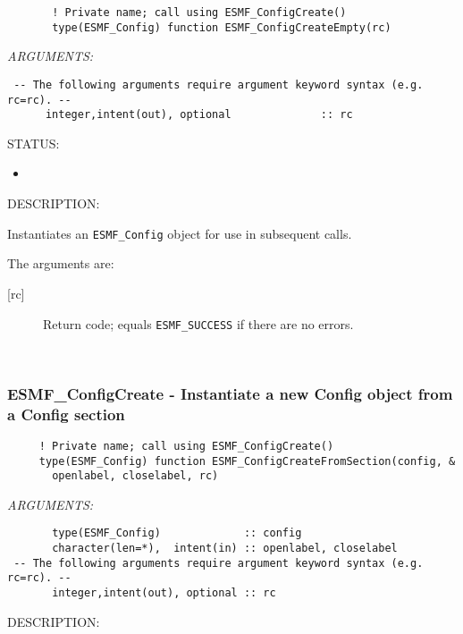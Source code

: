   
\begin{verbatim}       ! Private name; call using ESMF_ConfigCreate()
       type(ESMF_Config) function ESMF_ConfigCreateEmpty(rc)
 \end{verbatim}{\em ARGUMENTS:}
\begin{verbatim} -- The following arguments require argument keyword syntax (e.g. rc=rc). --
      integer,intent(out), optional              :: rc \end{verbatim}
{\sf STATUS:}
   \begin{itemize}
   \item{}
   \end{itemize}
  
{\sf DESCRIPTION:\\ }

 
     Instantiates an {\tt ESMF\_Config} object for use in subsequent calls.
  
     The arguments are:
     \begin{description}
     \item [{[rc]}]
       Return code; equals {\tt ESMF\_SUCCESS} if there are no errors.
     \end{description}
   
 
\mbox{}\hrulefill\ 
 

  \subsubsection [ESMF\_ConfigCreate] {ESMF\_ConfigCreate - Instantiate a new Config object from a Config section}


  
\begin{verbatim}     ! Private name; call using ESMF_ConfigCreate()
     type(ESMF_Config) function ESMF_ConfigCreateFromSection(config, &
       openlabel, closelabel, rc)
 \end{verbatim}{\em ARGUMENTS:}
\begin{verbatim}       type(ESMF_Config)             :: config
       character(len=*),  intent(in) :: openlabel, closelabel
 -- The following arguments require argument keyword syntax (e.g. rc=rc). --
       integer,intent(out), optional :: rc\end{verbatim}
{\sf DESCRIPTION:\\ }



